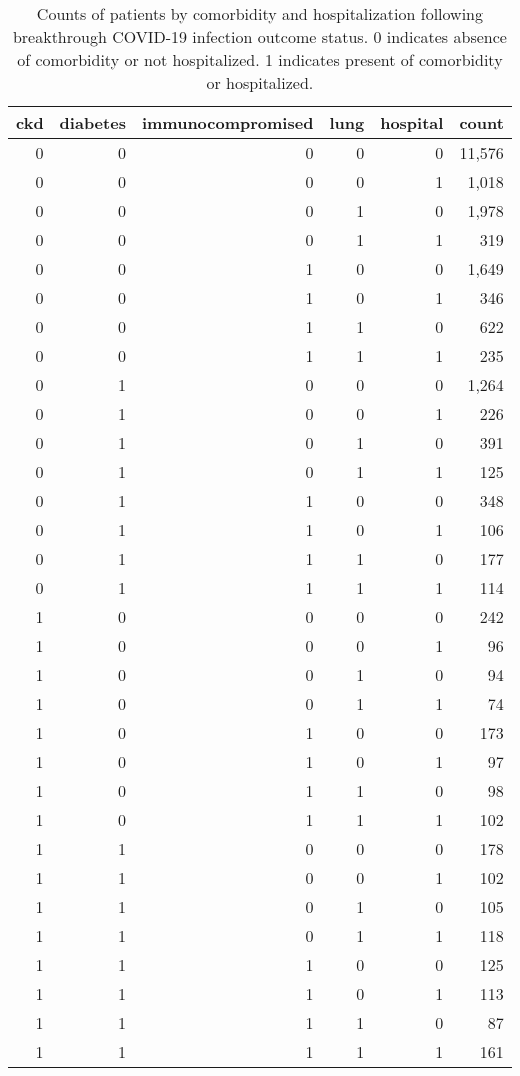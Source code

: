 \begin{table}[!htbp]
\centering
\begin{tabular}{rrrrrr}
  \hline
ckd & diabetes & immunocompromised & lung & hospital & count \\ 
  \hline
  0 &   0 &   0 &   0 &   0 & 11,576 \\ 
    0 &   0 &   0 &   0 &   1 & 1,018 \\ 
    0 &   0 &   0 &   1 &   0 & 1,978 \\ 
    0 &   0 &   0 &   1 &   1 & 319 \\ 
    0 &   0 &   1 &   0 &   0 & 1,649 \\ 
    0 &   0 &   1 &   0 &   1 & 346 \\ 
    0 &   0 &   1 &   1 &   0 & 622 \\ 
    0 &   0 &   1 &   1 &   1 & 235 \\ 
    0 &   1 &   0 &   0 &   0 & 1,264 \\ 
    0 &   1 &   0 &   0 &   1 & 226 \\ 
    0 &   1 &   0 &   1 &   0 & 391 \\ 
    0 &   1 &   0 &   1 &   1 & 125 \\ 
    0 &   1 &   1 &   0 &   0 & 348 \\ 
    0 &   1 &   1 &   0 &   1 & 106 \\ 
    0 &   1 &   1 &   1 &   0 & 177 \\ 
    0 &   1 &   1 &   1 &   1 & 114 \\ 
    1 &   0 &   0 &   0 &   0 & 242 \\ 
    1 &   0 &   0 &   0 &   1 &  96 \\ 
    1 &   0 &   0 &   1 &   0 &  94 \\ 
    1 &   0 &   0 &   1 &   1 &  74 \\ 
    1 &   0 &   1 &   0 &   0 & 173 \\ 
    1 &   0 &   1 &   0 &   1 &  97 \\ 
    1 &   0 &   1 &   1 &   0 &  98 \\ 
    1 &   0 &   1 &   1 &   1 & 102 \\ 
    1 &   1 &   0 &   0 &   0 & 178 \\ 
    1 &   1 &   0 &   0 &   1 & 102 \\ 
    1 &   1 &   0 &   1 &   0 & 105 \\ 
    1 &   1 &   0 &   1 &   1 & 118 \\ 
    1 &   1 &   1 &   0 &   0 & 125 \\ 
    1 &   1 &   1 &   0 &   1 & 113 \\ 
    1 &   1 &   1 &   1 &   0 &  87 \\ 
    1 &   1 &   1 &   1 &   1 & 161 \\ 
   \hline
\end{tabular}
\caption{Counts of patients by comorbidity and hospitalization following breakthrough COVID-19 infection outcome status. 0 indicates absence of comorbidity or not hospitalized. 1 indicates present of comorbidity or hospitalized.} 
\label{tab:hospital_counts}
\end{table}
